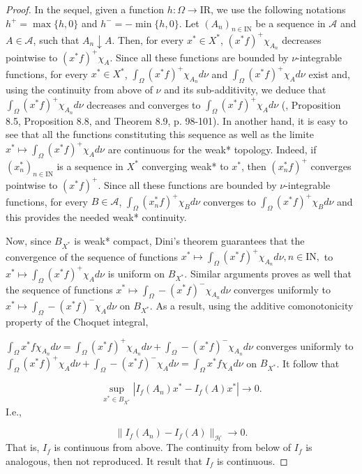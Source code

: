 \documentclass[preprint,authoryear,12pt]{article}%
\theoremstyle{definition}
\renewcommand{\AA}{{\mathcal A}}
\newcommand{\IR}{{\mathrm{I\!R}}}
\newcommand{\IN}{{\mathrm{I\!N}}}
\newcommand{\HH}{{\mathcal H}}
\begin{document}
\begin{proof} In the sequel, given a function $h:\Omega\rightarrow \IR$, we use the following notations $h^+=\max\{ h, 0\}$ and $h^-=-\min\{ h, 0\}$.  
Let $(A_n)_{n\in \IN}$ be a sequence in $\AA$ and $A\in \AA$, such that $A_n\downarrow A$. Then, for every $x^*\in X^*$, $(x^*f)^+\chi_{A_n} $ decreases pointwise to $(x^*f)^+\chi_A$.  Since all these functions are bounded by $\nu$-integrable functions, for every $x^*\in X^*$, $\int_\Omega (x^*f)^+\chi_{A_n} d\nu$ and $\int_\Omega (x^*f)^+\chi_A d\nu$ exist and, using the continuity from above of $\nu$ and its sub-additivity, we deduce that $\int_\Omega (x^*f)^+\chi_{A_n} d\nu$ decreases and converges to $\int_\Omega (x^*f)^+\chi_A d\nu$ (\citet{DEN94}, Proposition 8.5, Proposition 8.8, and Theorem 8.9, p. 98-101). 
In another hand, it is easy to see that all the functions constituting this sequence as well as the limite $x^*\mapsto\int_\Omega (x^*f)^+\chi_A d\nu$ are continuous for the weak* topology. Indeed, if $(x^*_n)_{n\in \IN}$ is a  sequence in $X^*$ converging weak* to $x^*$, then $(x_n^*f)^+$ converges pointwise to $(x^*f)^+$. Since all these functions are bounded by $\nu$-integrable functions, for every $B\in \AA$, $\int_\Omega (x_n^*f)^+\chi_B d\nu$ converges to $\int_\Omega (x^*f)^+\chi_B d\nu$ and this provides the needed weak* continuity.   

Now, since $B_{X^*}$ is weak* compact, Dini's theorem guarantees that the convergence of the sequence  of functions $x^*\mapsto \int_\Omega (x^*f)^+\chi_{A_n} d\nu,n\in \IN,$ to $x^*\mapsto \int_\Omega (x^*f)^+\chi_A d\nu$  is uniform on $B_{X^*}$. 
Similar arguments proves as well that the sequence of functions $x^*\mapsto \int_\Omega - (x^*f)^-\chi_{A_n} d\nu$ converges uniformly to $x^*\mapsto \int_\Omega - (x^*f)^-\chi_{A} d\nu$  on $B_{X^*}$.  As a result, using the additive comonotonicity property of the Choquet integral, 

$\int_\Omega x^*f\chi_{A_n} d\nu=\int_\Omega (x^*f)^+\chi_{A_n} d\nu+\int_\Omega - (x^*f)^-\chi_{A_n}d\nu$ converges uniformly to $\int_\Omega (x^*f)^+\chi_{A} d\nu+\int_\Omega - (x^*f)^-\chi_{A} d\nu=\int_\Omega x^*f\chi_A d\nu$ on $B_{X^*}$. It follow that 

$$\underset{x^*\in B_{X^*} }{\sup} |I_f(A_n)x^*- I_f(A)x^*|\rightarrow 0.$$
I.e.,

$$ \| I_f(A_n)- I_f(A)\|_\HH\rightarrow 0.$$
That is, $ I_f$ is continuous from above. The continuity from below of $ I_f$ is analogous, then not reproduced. It result that $ I_f$ is continuous.   
\end{proof}
\end{document}
